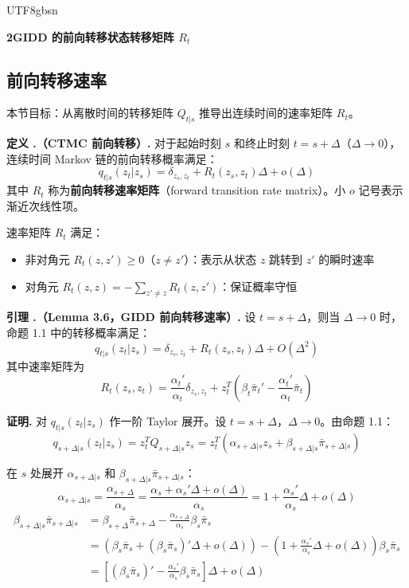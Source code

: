 \documentclass[11pt,a4paper]{article}
\newcounter{lemma}[section]
\newcounter{definition}[section]
\renewcommand{\thelemma}{\thesection.\arabic{lemma}}
\renewcommand{\thedefinition}{\thesection.\arabic{definition}}
\begin{document}
\begin{CJK}{UTF8}{gbsn}
\begin{center}
{\LARGE\bfseries 2\quad GIDD 的前向转移状态转移矩阵 $R_t$}
\end{center}

\setcounter{section}{2}
\setcounter{subsection}{0}
\setcounter{lemma}{0}

\subsection{前向转移速率}

本节目标：从离散时间的转移矩阵 $Q_{t|s}$ 推导出连续时间的速率矩阵 $R_t$。

\begin{defbox}
\textbf{定义 \thedefinition（CTMC 前向转移）.} 对于起始时刻 $s$ 和终止时刻 $t = s + \Delta$（$\Delta \to 0$），连续时间 Markov 链的前向转移概率满足：
\[
q_{t|s}(z_t|z_s) = \delta_{z_s,z_t} + R_t(z_s, z_t)\Delta + o(\Delta)
\]
其中 $R_t$ 称为\textbf{前向转移速率矩阵}（forward transition rate matrix）。小 $o$ 记号表示渐近次线性项。

速率矩阵 $R_t$ 满足：
\begin{itemize}[leftmargin=2em]
\item 非对角元 $R_t(z, z') \geq 0$（$z \neq z'$）：表示从状态 $z$ 跳转到 $z'$ 的瞬时速率
\item 对角元 $R_t(z, z) = -\sum_{z' \neq z} R_t(z, z')$：保证概率守恒
\end{itemize}
\end{defbox}

\begin{lembox}
\textbf{引理 \thelemma（Lemma 3.6，GIDD 前向转移速率）.} 设 $t = s + \Delta$，则当 $\Delta \to 0$ 时，命题 1.1 中的转移概率满足：
\[
q_{t|s}(z_t|z_s) = \delta_{z_s,z_t} + R_t(z_s, z_t)\Delta + O(\Delta^2)
\]
其中速率矩阵为
\[
R_t(z_s, z_t) = \frac{\alpha_t'}{\alpha_t}\delta_{z_s,z_t} + z_t^T\left(\beta_t\bar{\pi}_t' - \frac{\alpha_t'}{\alpha_t}\bar{\pi}_t\right)
\]
\end{lembox}

\textbf{证明.} 对 $q_{t|s}(z_t|z_s)$ 作一阶 Taylor 展开。设 $t = s + \Delta$，$\Delta \to 0$。由命题 1.1：
\[
q_{s+\Delta|s}(z_t|z_s) = z_t^T Q_{s+\Delta|s} z_s = z_t^T\left(\alpha_{s+\Delta|s} z_s + \beta_{s+\Delta|s}\bar{\pi}_{s+\Delta|s}\right)
\]

在 $s$ 处展开 $\alpha_{s+\Delta|s}$ 和 $\beta_{s+\Delta|s}\bar{\pi}_{s+\Delta|s}$：
\[
\alpha_{s+\Delta|s} = \frac{\alpha_{s+\Delta}}{\alpha_s} = \frac{\alpha_s + \alpha_s'\Delta + o(\Delta)}{\alpha_s} = 1 + \frac{\alpha_s'}{\alpha_s}\Delta + o(\Delta)
\]
\begin{align*}
\beta_{s+\Delta|s}\bar{\pi}_{s+\Delta|s} &= \beta_{s+\Delta}\bar{\pi}_{s+\Delta} - \frac{\alpha_{s+\Delta}}{\alpha_s}\beta_s\bar{\pi}_s \\
&= \left(\beta_s\bar{\pi}_s + (\beta_s\bar{\pi}_s)'\Delta + o(\Delta)\right) - \left(1 + \frac{\alpha_s'}{\alpha_s}\Delta + o(\Delta)\right)\beta_s\bar{\pi}_s \\
&= \left[(\beta_s\bar{\pi}_s)' - \frac{\alpha_s'}{\alpha_s}\beta_s\bar{\pi}_s\right]\Delta + o(\Delta)
\end{align*}


\end{CJK}
\end{document}

